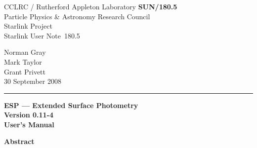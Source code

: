 \documentclass[twoside,11pt]{article}
\newcommand{\stardoccategory}  {Starlink User Note}
\newcommand{\stardocinitials}  {SUN}
\newcommand{\stardocnumber}    {180.5}
\newcommand{\stardocauthors}   {Norman Gray\\Mark Taylor\\Grant Privett}
\newcommand{\stardocdate}      {30 September 2008}
\newcommand{\stardoctitle}     {ESP --- Extended Surface Photometry}
\newcommand{\stardocversion}   {Version 0.11-4}	%
\newcommand{\stardocmanual}    {User's Manual}
\newcommand{\stardocname}{\stardocinitials /\stardocnumber}
\newenvironment{latexonly}{}{}
\begin{document}
\thispagestyle{empty}

\begin{latexonly}
   CCLRC / {\sc Rutherford Appleton Laboratory} \hfill {\bf \stardocname}\\
   {\large Particle Physics \& Astronomy Research Council}\\
   {\large Starlink Project\\}
   {\large \stardoccategory\ \stardocnumber}
   \begin{flushright}
   \stardocauthors\\
   \stardocdate
   \end{flushright}
   \vspace{-4mm}
   \rule{\textwidth}{0.5mm}
   \vspace{5mm}
   \begin{center}
   {\Huge\bf  \stardoctitle \\ [2.5ex]}
   {\LARGE\bf \stardocversion \\ [4ex]}
   {\Huge\bf  \stardocmanual}
   \end{center}
   \vspace{5mm}

   \vspace{10mm}
   \begin{center}
      {\Large\bf Abstract}
   \end{center}
\end{latexonly}
\end{document}
